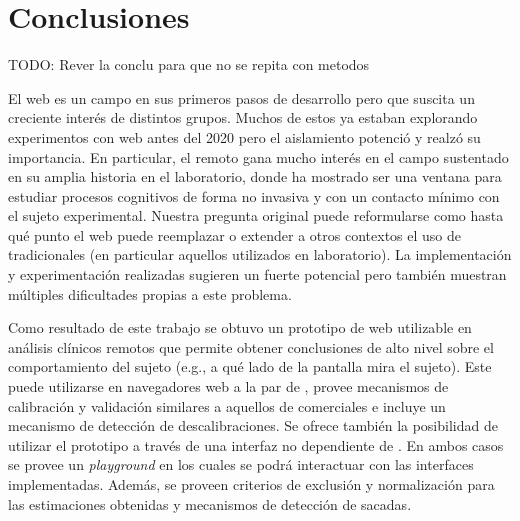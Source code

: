 \chapter{Conclusiones}

TODO: Rever la conclu para que no se repita con metodos

El \eyetracking web es un campo en sus primeros pasos de desarrollo pero que
suscita un creciente interés de distintos grupos.
Muchos de estos ya estaban explorando experimentos con \eyetracking web antes
del 2020 pero el aislamiento potenció y realzó su importancia.
En particular, el \eyetracking remoto gana mucho interés en el campo sustentado
en su amplia historia en el laboratorio, donde ha mostrado ser una ventana para
estudiar procesos cognitivos de forma no invasiva y con un contacto mínimo con
el sujeto experimental.
Nuestra pregunta original puede reformularse como hasta qué punto el
\eyetracking web puede reemplazar o extender a otros contextos el uso de
\eyetrackers tradicionales (en particular aquellos utilizados en laboratorio).
La implementación y experimentación realizadas sugieren un fuerte potencial
pero también muestran múltiples dificultades propias a este problema.

Como resultado de este trabajo se obtuvo un prototipo de \eyetracker web
utilizable en análisis clínicos remotos que permite obtener conclusiones de
alto nivel sobre el comportamiento del sujeto (e.g., a qué lado de la pantalla
mira el sujeto).
Este puede utilizarse en navegadores web a la par de \jspsych, provee
mecanismos de calibración y validación similares a aquellos de \eyetrackers
comerciales e incluye un mecanismo de detección de descalibraciones.
Se ofrece también la posibilidad de utilizar el prototipo a través de una
interfaz no dependiente de \jspsych.
En ambos casos se provee un \textit{playground} en los cuales se podrá
interactuar con las interfaces implementadas.
Además, se proveen criterios de exclusión y normalización para las estimaciones
obtenidas y mecanismos de detección de sacadas.

